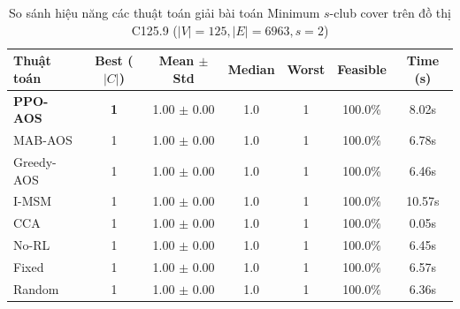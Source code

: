 \begin{table}[htbp]
\centering
\caption{So sánh hiệu năng các thuật toán giải bài toán Minimum $s$-club cover trên đồ thị C125.9 ($|V|=125, |E|=6963, s=2$)}
\label{tab:results_C125_9}
\begin{tabular}{lcccccc}
\hline
\textbf{Thuật toán} & \textbf{Best ($|C|$)} & \textbf{Mean $\pm$ Std} & \textbf{Median} & \textbf{Worst} & \textbf{Feasible} & \textbf{Time (s)} \\
\hline
\textbf{PPO-AOS} & \textbf{1} & 1.00 $\pm$ 0.00 & 1.0 & 1 & 100.0\% & 8.02s \\
MAB-AOS & 1 & 1.00 $\pm$ 0.00 & 1.0 & 1 & 100.0\% & 6.78s \\
Greedy-AOS & 1 & 1.00 $\pm$ 0.00 & 1.0 & 1 & 100.0\% & 6.46s \\
I-MSM & 1 & 1.00 $\pm$ 0.00 & 1.0 & 1 & 100.0\% & 10.57s \\
CCA & 1 & 1.00 $\pm$ 0.00 & 1.0 & 1 & 100.0\% & 0.05s \\
No-RL & 1 & 1.00 $\pm$ 0.00 & 1.0 & 1 & 100.0\% & 6.45s \\
Fixed & 1 & 1.00 $\pm$ 0.00 & 1.0 & 1 & 100.0\% & 6.57s \\
Random & 1 & 1.00 $\pm$ 0.00 & 1.0 & 1 & 100.0\% & 6.36s \\
\hline
\end{tabular}
\end{table}
